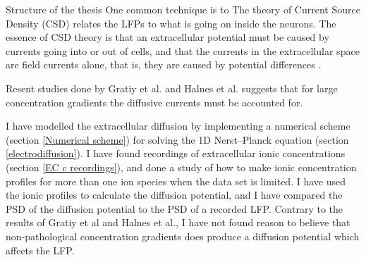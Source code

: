 \documentclass{uiophd}
\begin{document}
{Structure of the thesis}
  One common technique is to 
The theory of Current Source Density (CSD) relates the LFPs to what is going on inside the neurons. The essence of CSD theory is that an extracellular potential must be caused by currents going into or out of cells, and that the currents in the extracellular space are field currents alone, that is, they are caused by potential differences \cite{Gratiy2017}. 

Resent studies done by Gratiy et al. and Halnes et al. suggests that for large concentration gradients the diffusive currents must be accounted for. 



 I have modelled the extracellular diffusion by implementing a numerical scheme (section \ref{Numerical scheme}) for solving the 1D  Nerst--Planck equation (section  \ref{electrodiffusion}). I have found recordings of extracellular ionic concentrations (section \ref{EC c recordings}), and done a study of how to make ionic concentration profiles for more than one ion species when the data set is limited. I have used the ionic profiles to calculate the diffusion potential, and I have compared the PSD of the diffusion potential to the PSD of a recorded LFP.  Contrary to the results of Gratiy et al and Halnes et al., I have not found reason to believe that non-pathological concentration gradients does produce a diffusion potential which affects the LFP. 
\end{document}
